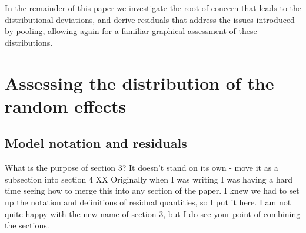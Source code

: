 \documentclass[12pt]{article} %
\newcommand{\hh}[1]{{\color{orange} #1}}
\newcommand{\al}[1]{{\color{red} #1}}
\begin{document}


In the remainder of this paper we investigate the root of concern that leads to the distributional deviations, and derive residuals that address the issues introduced by pooling, allowing again for a familiar graphical assessment of these distributions.

\section{Assessing the distribution of the random effects}\label{sec:}

\subsection{Model notation and residuals}\label{sec:resid}
\hh{What is the purpose of section 3? It doesn't stand on its own - move it as a subsection into section 4} \al{XX Originally when I was writing I was having a hard time seeing how to merge this into any section of the paper. I knew we had to set up the notation and definitions of residual quantities, so I put it here. I am not quite happy with the new name of section 3, but I do see your point of combining the sections.}
\end{document}
